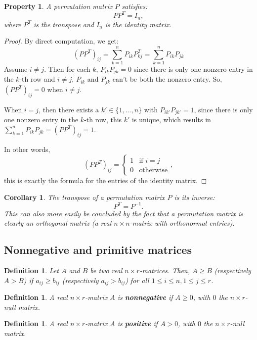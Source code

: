\documentclass[a4paper,11pt]{report}
\newtheorem{property}[theorem]{Property}
\newtheorem{definition}[theorem]{Definition}
\newtheorem{corollary}[theorem]{Corollary}
\begin{document}
\begin{property}\label{permutatie}
A permutation matrix $P$ satisfies:
  $$PP^T = I_n,$$
  where $P^T$ is the transpose and $I_n$ is the identity matrix.
\end{property}
\begin{proof}
By direct computation, we get:
$$(PP^T)_{ij} = \sum^n_{k=1}P_{ik}P^T_{kj} = \sum^n_{k=1}P_{ik}P_{jk}$$
Assume $i \not = j$. Then for each $k$, $P_{ik}P_{jk} = 0$ since there is only
one nonzero entry in the $k$-th row and $i \not = j$, $P_{ik}$ and $P_{jk}$ 
can't be both the nonzero entry. So, $(PP^T)_{ij} = 0$ when $i \not = j$.

When $i=j$, then there exists a $k' \in \{1,\ldots,n\}$ with $P_{ik'}P_{jk'} = 1$, 
since there is only one nonzero entry in the $k$-th row, this $k'$ is unique, 
which results in $\sum^n_{k=1}P_{ik}P_{jk} = (PP^T)_{ij} = 1$.

In other words,
$$(PP^T)_{ij} = \begin{cases} 1 &\mbox{if } i = j \\ 
0 & \mbox{otherwise} \end{cases},$$
this is exactly the formula for the entries of the identity matrix.
\end{proof}

\begin{corollary}
  The transpose of a permutation matrix $P$ is its inverse:
  $$P^T = P^{-1}.$$
  This can also more easily be concluded by the fact that a permutation matrix 
  is clearly an orthogonal matrix (a real $n \times n$-matrix with orthonormal 
  entries).
\end{corollary}
\subsection{Nonnegative and primitive matrices}
\begin{definition}\label{groterkleiner}
  Let $A$ and $B$ be two real $n\times r$-matrices. Then, $A \geq B$ (respectively $A > B$) if $a_{ij} \geq b_{ij}$ 
  (respectively $a_{ij}>b_{ij}$) for all $1 \leq i \leq n, 1 \leq j\leq r$. 
\end{definition}
\begin{definition}  A real $n\times r$-matrix $A$ is \textbf{nonnegative} if $A \geq 0$, with $0$ the $n\times r$-null matrix.
\end{definition}
\begin{definition}  A real $n\times r$-matrix $A$ is \textbf{positive} if $A > 0$, with $0$ the $n\times r$-null matrix.
\end{definition}
\end{document}
